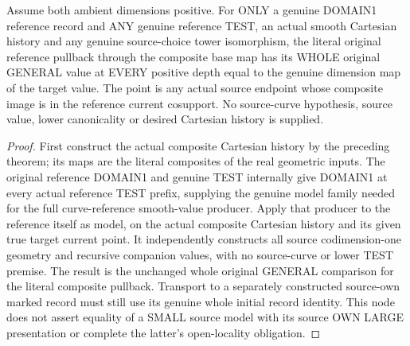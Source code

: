 \begin{theorem}
\label{hir:original-source-choice-actual-curve-model-full-values}
\leanok
Assume both ambient dimensions positive. For ONLY a genuine DOMAIN1
reference record and ANY genuine reference TEST, an actual smooth
Cartesian history and any genuine source-choice tower isomorphism,
the literal original reference pullback through the composite base
map has its WHOLE original GENERAL value at EVERY positive depth equal
to the genuine dimension map of the target value. The point is any
actual source endpoint whose composite image is in the reference
current cosupport. No source-curve hypothesis, source value, lower
canonicality or desired Cartesian history is supplied.
\end{theorem}
\begin{proof}
First construct the actual composite Cartesian history by the preceding
theorem; its maps are the literal composites of the real geometric
inputs. The original reference DOMAIN1 and genuine TEST internally give
DOMAIN1 at every actual reference TEST prefix, supplying the genuine
model family needed for the full curve-reference smooth-value producer.
Apply that producer to the reference itself as model, on the actual
composite Cartesian history and its given true target current point.
It independently constructs all source codimension-one geometry and
recursive companion values, with no source-curve or lower TEST premise.
The result is the unchanged whole original GENERAL comparison for the
literal composite pullback. Transport to a separately constructed
source-own marked record must still use its genuine whole initial
record identity. This node does not assert equality of a SMALL source
model with its source OWN LARGE presentation or complete the latter's
open-locality obligation.
\end{proof}
